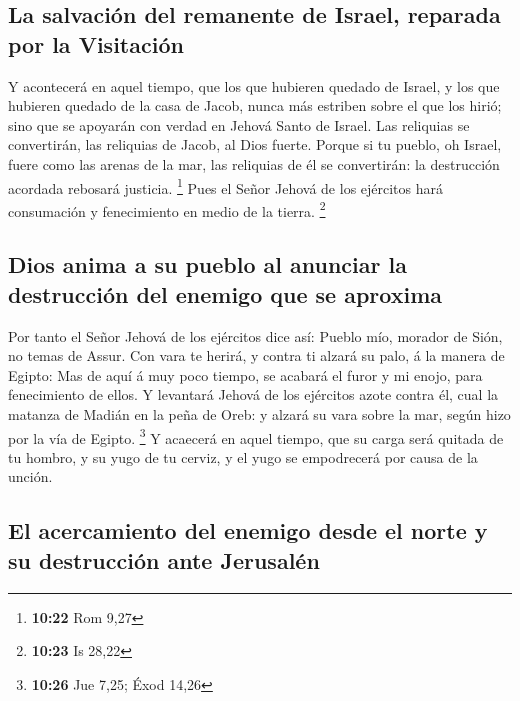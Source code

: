 \hypertarget{la-salvaciuxf3n-del-remanente-de-israel-reparada-por-la-visitaciuxf3n}{%
\subsection{La salvación del remanente de Israel, reparada por la
Visitación}\label{la-salvaciuxf3n-del-remanente-de-israel-reparada-por-la-visitaciuxf3n}}

 Y acontecerá en aquel tiempo, que los que hubieren quedado
de Israel, y los que hubieren quedado de la casa de Jacob, nunca más
estriben sobre el que los hirió; sino que se apoyarán con verdad en
Jehová Santo de Israel.  Las reliquias se convertirán, las
reliquias de Jacob, al Dios fuerte.  Porque si tu pueblo,
oh Israel, fuere como las arenas de la mar, las reliquias de él se
convertirán: la destrucción acordada rebosará justicia. \footnote{\textbf{10:22}
  Rom 9,27}  Pues el Señor Jehová de los ejércitos hará
consumación y fenecimiento en medio de la tierra. \footnote{\textbf{10:23}
  Is 28,22}

\hypertarget{dios-anima-a-su-pueblo-al-anunciar-la-destrucciuxf3n-del-enemigo-que-se-aproxima}{%
\subsection{Dios anima a su pueblo al anunciar la destrucción del
enemigo que se
aproxima}\label{dios-anima-a-su-pueblo-al-anunciar-la-destrucciuxf3n-del-enemigo-que-se-aproxima}}

 Por tanto el Señor Jehová de los ejércitos dice así:
Pueblo mío, morador de Sión, no temas de Assur. Con vara te herirá, y
contra ti alzará su palo, á la manera de Egipto:  Mas de
aquí á muy poco tiempo, se acabará el furor y mi enojo, para
fenecimiento de ellos.  Y levantará Jehová de los ejércitos
azote contra él, cual la matanza de Madián en la peña de Oreb: y alzará
su vara sobre la mar, según hizo por la vía de Egipto. \footnote{\textbf{10:26}
  Jue 7,25; Éxod 14,26}  Y acaecerá en aquel tiempo, que su
carga será quitada de tu hombro, y su yugo de tu cerviz, y el yugo se
empodrecerá por causa de la unción.

\hypertarget{el-acercamiento-del-enemigo-desde-el-norte-y-su-destrucciuxf3n-ante-jerusaluxe9n}{%
\subsection{El acercamiento del enemigo desde el norte y su destrucción
ante
Jerusalén}\label{el-acercamiento-del-enemigo-desde-el-norte-y-su-destrucciuxf3n-ante-jerusaluxe9n}}

